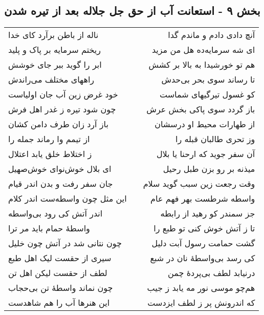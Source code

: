 \begin{center}
\section*{بخش ۹ - استعانت آب از حق جل جلاله بعد از تیره شدن}
\label{sec:sh009}
\begin{longtable}{l p{0.5cm} r}
ناله از باطن برآرد کای خدا
&&
آنچ دادی دادم و ماندم گدا
\\
ریختم سرمایه بر پاک و پلید
&&
ای شه سرمایه‌ده هل من مزید
\\
ابر را گوید ببر جای خوشش
&&
هم تو خورشیدا به بالا بر کشش
\\
راههای مختلف می‌راندش
&&
تا رساند سوی بحر بی‌حدش
\\
خود غرض زین آب جان اولیاست
&&
کو غسول تیرگیهای شماست
\\
چون شود تیره ز غدر اهل فرش
&&
باز گردد سوی پاکی بخش عرش
\\
باز آرد زان طرف دامن کشان
&&
از طهارات محیط او درسشان
\\
از تیمم وا رماند جمله را
&&
وز تحری طالبان قبله را
\\
ز اختلاط خلق یابد اعتلال
&&
آن سفر جوید که ارحنا یا بلال
\\
ای بلال خوش‌نوای خوش‌صهیل
&&
میذنه بر رو بزن طبل رحیل
\\
جان سفر رفت و بدن اندر قیام
&&
وقت رجعت زین سبب گوید سلام
\\
این مثل چون واسطه‌ست اندر کلام
&&
واسطه شرطست بهر فهم عام
\\
اندر آتش کی رود بی‌واسطه
&&
جز سمندر کو رهید از رابطه
\\
واسطهٔ حمام باید مر ترا
&&
تا ز آتش خوش کنی تو طبع را
\\
چون نتانی شد در آتش چون خلیل
&&
گشت حمامت رسول آبت دلیل
\\
سیری از حقست لیک اهل طبع
&&
کی رسد بی‌واسطهٔ نان در شبع
\\
لطف از حقست لیکن اهل تن
&&
درنیابد لطف بی‌پردهٔ چمن
\\
چون نماند واسطهٔ تن بی‌حجاب
&&
هم‌چو موسی نور مه یابد ز جیب
\\
این هنرها آب را هم شاهدست
&&
که اندرونش پر ز لطف ایزدست
\\
\end{longtable}
\end{center}

